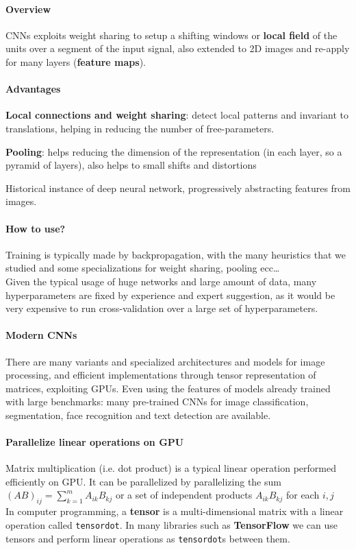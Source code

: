 \documentclass[10pt]{report}
\begin{document}
\paragraph{Overview} CNNs exploits weight sharing to setup a shifting windows or \textbf{local field} of the units over a segment of the input signal, also extended to 2D images and re-apply for many layers (\textbf{feature maps}).
\paragraph{Advantages}
\begin{list}{}{}
	\item \textbf{Local connections and weight sharing}: detect local patterns and invariant to translations, helping in reducing the number of free-parameters.
	\item \textbf{Pooling}: helps reducing the dimension of the representation (in each layer, so a pyramid of layers), also helps to small shifts and distortions
	\item Historical instance of deep neural network, progressively abstracting features from images.
\end{list}
\paragraph{How to use?} Training is typically made by backpropagation, with the many heuristics that we studied and some specializations for weight sharing, pooling ecc\ldots\\
Given the typical usage of huge networks and large amount of data, many hyperparameters are fixed by experience and expert suggestion, as it would be very expensive to run cross-validation over a large set of hyperparameters.
\paragraph{Modern CNNs} There are many variants and specialized architectures and models for image processing, and efficient implementations through tensor representation of matrices, exploiting GPUs. Even using the features of models already trained with large benchmarks: many pre-trained CNNs for image classification, segmentation, face recognition and text detection are available.
\paragraph{Parallelize linear operations on GPU} Matrix multiplication (i.e. dot product) is a typical linear operation performed efficiently on GPU. It can be parallelized by parallelizing the sum $(AB)_{ij} = \sum_{k=1}^m A_{ik}B_{kj}$ or a set of independent products $A_{ik}B_{kj}$ for each $i,j$\\
In computer programming, a \textbf{tensor} is a multi-dimensional matrix with a linear operation called \texttt{tensordot}. In many libraries such as \textbf{TensorFlow} we can use tensors and perform linear operations as \texttt{tensordot}s between them.
\end{document}
